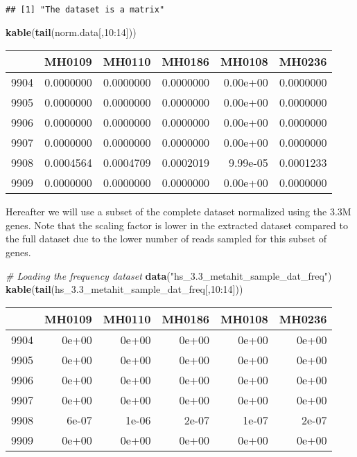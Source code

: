 \documentclass[]{article}
\newenvironment{Shaded}{\begin{snugshade}}{\end{snugshade}}
\newcommand{\KeywordTok}[1]{\textcolor[rgb]{0.13,0.29,0.53}{\textbf{{#1}}}}
\newcommand{\DecValTok}[1]{\textcolor[rgb]{0.00,0.00,0.81}{{#1}}}
\newcommand{\StringTok}[1]{\textcolor[rgb]{0.31,0.60,0.02}{{#1}}}
\newcommand{\CommentTok}[1]{\textcolor[rgb]{0.56,0.35,0.01}{\textit{{#1}}}}
\newcommand{\NormalTok}[1]{{#1}}
\begin{document}
\begin{verbatim}
## [1] "The dataset is a matrix"
\end{verbatim}

\begin{Shaded}
\begin{Highlighting}[]
\KeywordTok{kable}\NormalTok{(}\KeywordTok{tail}\NormalTok{(norm.data[,}\DecValTok{10}\NormalTok{:}\DecValTok{14}\NormalTok{]))}
\end{Highlighting}
\end{Shaded}

\begin{longtable}[c]{@{}lrrrrr@{}}
\toprule
& MH0109 & MH0110 & MH0186 & MH0108 & MH0236\tabularnewline
\midrule
\endhead
9904 & 0.0000000 & 0.0000000 & 0.0000000 & 0.00e+00 &
0.0000000\tabularnewline
9905 & 0.0000000 & 0.0000000 & 0.0000000 & 0.00e+00 &
0.0000000\tabularnewline
9906 & 0.0000000 & 0.0000000 & 0.0000000 & 0.00e+00 &
0.0000000\tabularnewline
9907 & 0.0000000 & 0.0000000 & 0.0000000 & 0.00e+00 &
0.0000000\tabularnewline
9908 & 0.0004564 & 0.0004709 & 0.0002019 & 9.99e-05 &
0.0001233\tabularnewline
9909 & 0.0000000 & 0.0000000 & 0.0000000 & 0.00e+00 &
0.0000000\tabularnewline
\bottomrule
\end{longtable}

Hereafter we will use a subset of the complete dataset normalized using
the 3.3M genes. Note that the scaling factor is lower in the extracted
dataset compared to the full dataset due to the lower number of reads
sampled for this subset of genes.

\begin{Shaded}
\begin{Highlighting}[]
\CommentTok{# Loading the frequency dataset}
\KeywordTok{data}\NormalTok{(}\StringTok{"hs_3.3_metahit_sample_dat_freq"}\NormalTok{)}
\KeywordTok{kable}\NormalTok{(}\KeywordTok{tail}\NormalTok{(hs_3.3_metahit_sample_dat_freq[,}\DecValTok{10}\NormalTok{:}\DecValTok{14}\NormalTok{]))}
\end{Highlighting}
\end{Shaded}

\begin{longtable}[c]{@{}lrrrrr@{}}
\toprule
& MH0109 & MH0110 & MH0186 & MH0108 & MH0236\tabularnewline
\midrule
\endhead
9904 & 0e+00 & 0e+00 & 0e+00 & 0e+00 & 0e+00\tabularnewline
9905 & 0e+00 & 0e+00 & 0e+00 & 0e+00 & 0e+00\tabularnewline
9906 & 0e+00 & 0e+00 & 0e+00 & 0e+00 & 0e+00\tabularnewline
9907 & 0e+00 & 0e+00 & 0e+00 & 0e+00 & 0e+00\tabularnewline
9908 & 6e-07 & 1e-06 & 2e-07 & 1e-07 & 2e-07\tabularnewline
9909 & 0e+00 & 0e+00 & 0e+00 & 0e+00 & 0e+00\tabularnewline
\bottomrule
\end{longtable}
\end{document}
